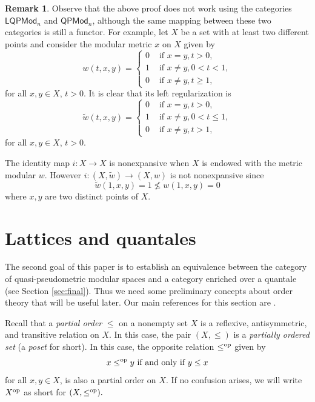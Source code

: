 \documentclass[11pt,a4paper]{amsart}
\theoremstyle{definition}
\newtheorem{remark}[theorem]{Remark}
\begin{document}
	\begin{remark}\label{rem:functor}
		Observe that the above proof does not work using the categories $\mathsf{LQPMod}_n$ and $\mathsf{QPMod}_n$, although the same mapping between these two categories is still a functor.  
		For example, let $X$ be a set with at least two different points and consider the modular metric $x$ on $X$ given by
		$$w(t,x,y)=\begin{cases}
			0&\text{ if }x= y, t>0,\\
			1&\text{ if }x\neq y,0<t<1,\\
			0&\text{ if }x\neq y,t\geq 1,
		\end{cases}$$
		for all $x,y\in X$, $t>0.$ It is clear that its left regularization is
		$$\widetilde{w}(t,x,y)=\begin{cases}
			0&\text{ if }x= y, t>0,\\
			1&\text{ if }x\neq y,0<t\leq 1,\\
			0&\text{ if }x\neq y,t>1,
		\end{cases}$$
		for all $x,y\in X$, $t>0.$
		
		The identity map $i:X\to X$ is nonexpansive when $X$ is endowed with the metric modular $w$. However $i:(X,\widetilde{w})\to (X,w)$ is not nonexpansive since
		$$\widetilde{w}(1,x,y)=1\not\leq w(1,x,y)=0$$
		where $x,y$ are two distinct points of $X.$
		
		
		
	\end{remark}
	
	\section{Lattices and quantales}\label{sec:lq}
	
	The second goal of this paper is to establish an equivalence between the category of quasi-pseudometric modular spaces and a category enriched over a quantale (see Section \ref{sec:final}). Thus we need some preliminary concepts about order theory that will be useful later. Our main references for this section are \cite{GierzHoffKeiLawMisScott,BookMonoidalTopology,BookQuantales}.
	
	Recall that a \emph{partial order} $\leq$ on a nonempty set $X$ is a reflexive, antisymmetric, and transitive relation on $X.$ In this case, the pair $(X,\leq)$ is a \emph{partially ordered set} (a \emph{poset} for short). In this case, the opposite relation $\leq^\text{\normalfont op}$ given by
	$$x\leq^\text{\normalfont op} y\text{ if and only if }y\leq x$$
	for all $x,y\in X$, is also a partial order on $X.$ If no confusion arises, we will write $X^\text{\normalfont op}$ as short for $(X,\leq^\text{\normalfont op}).$
	
\end{document}
